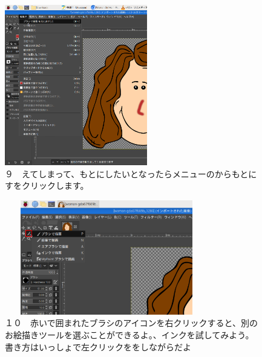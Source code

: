 \documentclass[a4paper,12pt]{jarticle}
\begin{document}
\begin{figure}[ht]
  \begin{minipage}{\textwidth}
    \begin{minipage}{6.984cm}
      \includegraphics[width=6.228cm]{textbook-img132.png}\\
      ９　えてしまって、もとにしたいとなったらメニューのからもとにすをクリックします。
    \end{minipage}
    \hfill
    \begin{minipage}{8.966cm}
      \includegraphics[width=8.881cm,height=4.997cm]{textbook-img133.png}\\
      １０　赤いで囲まれたブラシのアイコンを右クリックすると、別のお絵描きツールを選ぶことができるよ。、インクを試してみよう。書き方はいっしょで左クリックををしながらだよ
    \end{minipage}
  \end{minipage}
\end{figure}
\end{document}
